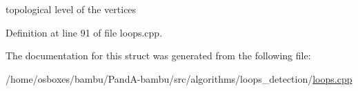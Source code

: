 topological level of the vertices 



Definition at line 91 of file loops.\+cpp.



The documentation for this struct was generated from the following file\+:\begin{DoxyCompactItemize}
\item 
/home/osboxes/bambu/\+Pand\+A-\/bambu/src/algorithms/loops\+\_\+detection/\hyperlink{loops_8cpp}{loops.\+cpp}\end{DoxyCompactItemize}

